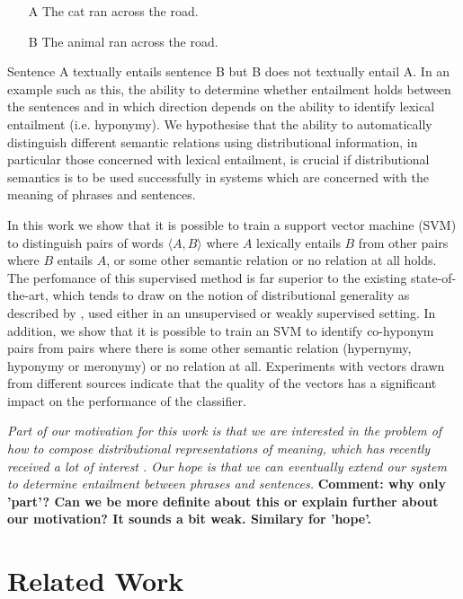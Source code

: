 \documentclass[11pt]{article}
\begin{document}
\begin{itemize}
\item[A]{The cat ran across the road.}
\item[B]{The animal ran across the road.}
\end{itemize}

Sentence A textually entails sentence B but B does not textually entail A. In an example such as this, the ability to determine whether entailment holds between the sentences and in which direction depends on the ability to identify lexical entailment (i.e. hyponymy). We hypothesise that the ability to automatically distinguish different semantic relations using distributional information, in particular those concerned with lexical entailment, is crucial if distributional semantics is to be used successfully in systems which are concerned with the meaning of phrases and sentences.

In this work we show that it is possible to train a support vector machine (SVM) to distinguish pairs of words $\langle A,B\rangle$ where $A$ lexically entails $B$ from other pairs where $B$ entails $A$, or some other semantic relation or no relation at all holds.  The perfomance of this supervised method is far superior to the existing state-of-the-art, which tends to draw on the notion of distributional generality as described by \cite{Weeds2004}, used either in an unsupervised or weakly supervised setting.  In addition, we show that it is possible to train an SVM to identify co-hyponym pairs from pairs where there is some other semantic relation (hypernymy, hyponymy or meronymy) or no relation at all. Experiments with vectors drawn from different sources indicate that the quality of the vectors has a significant impact on the performance of the classifier.

{\em Part of our motivation for this work is that we are interested in the
problem of how to compose distributional representations of meaning,
which has recently received a lot of interest
\cite{Widdows:08,Mitchell:08,Baroni2010,Grefenstette:11,Socher:12}. Our
hope is that we can eventually extend our system to determine
entailment between phrases and sentences.} {\bf Comment: why only 'part'? Can we be more definite about this or explain further about our motivation? It sounds a bit weak. Similary for 'hope'.}

\section{Related Work}
\end{document}
